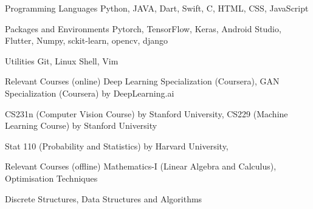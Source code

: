 

\begin{cvskills}

  \cvskill
    {Programming Languages} %
    {Python, JAVA, Dart, Swift, C, HTML, CSS, JavaScript} %

  \cvskill
    {Packages and Environments} %
    {Pytorch, TensorFlow, Keras, Android Studio, Flutter, Numpy, sckit-learn, opencv, django} %
    

  \cvskill
    {Utilities} %
    {Git, Linux Shell, Vim} %


  \cvskill
    {Relevant Courses (online)} %
    {Deep Learning Specialization (Coursera), GAN Specialization (Coursera) by DeepLearning.ai} %
    
  \cvskill
  {}
  {CS231n (Computer Vision Course) by Stanford University, CS229 (Machine Learning Course) by Stanford University}
  
  \cvskill
    {}
    {Stat 110 (Probability and Statistics) by Harvard University, } 
    
  \cvskill
    {Relevant Courses (offline)}
    {Mathematics-I (Linear Algebra and Calculus), Optimisation Techniques} 
    
  \cvskill
  {}
  {Discrete Structures, Data Structures and Algorithms}
\end{cvskills}
